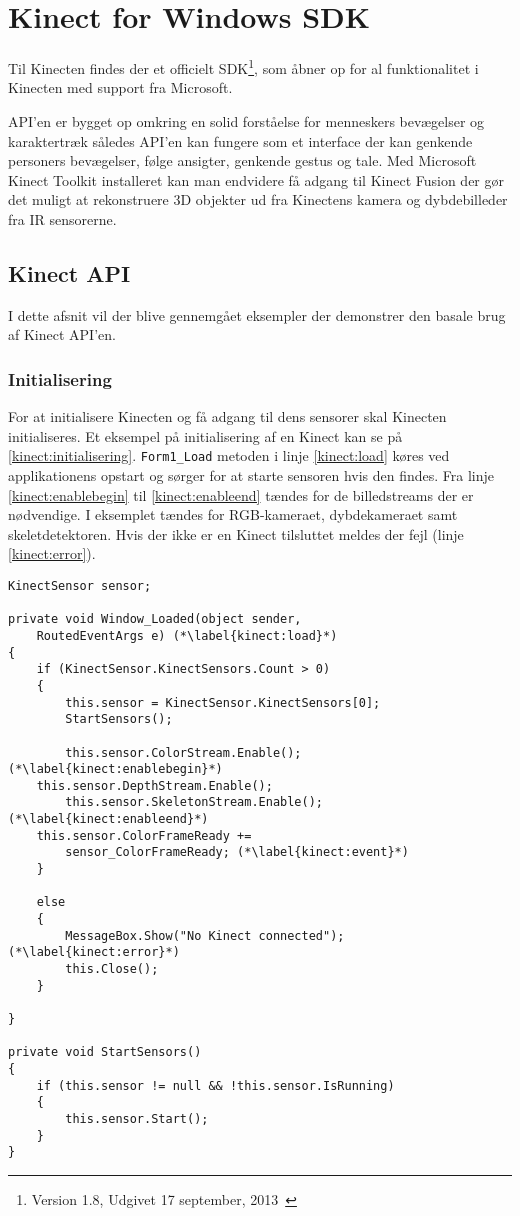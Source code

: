 \section{Kinect for Windows SDK}
Til Kinecten findes der et officielt SDK\footnote{ Version 1.8, Udgivet 17 september, 2013~\cite{kinectSDK18}}, som åbner op for al funktionalitet i Kinecten med support fra Microsoft.

API'en er bygget op omkring en solid forståelse for menneskers bevægelser og karaktertræk således API'en kan fungere som et interface der kan genkende personers bevægelser, følge ansigter, genkende gestus og tale.
Med Microsoft Kinect Toolkit installeret kan man endvidere få adgang til Kinect Fusion der gør det muligt at rekonstruere 3D objekter ud fra Kinectens kamera og dybdebilleder fra IR sensorerne.~\cite{kinectForWindowsFeatures}


\subsection{Kinect API}\label{kinect:kinectapi}
I dette afsnit vil der blive gennemgået eksempler der demonstrer den basale brug af Kinect API'en.

\subsubsection{Initialisering}
For at initialisere Kinecten og få adgang til dens sensorer skal Kinecten initialiseres.
Et eksempel på initialisering af en Kinect kan se på \cref{kinect:initialisering}. \lstinline[style=csharp]|Form1_Load| metoden i linje \ref{kinect:load} køres ved applikationens opstart og sørger for at starte sensoren hvis den findes. Fra linje \ref{kinect:enablebegin} til \ref{kinect:enableend} tændes for de billedstreams der er nødvendige. I eksemplet tændes for RGB-kameraet, dybdekameraet samt skeletdetektoren. Hvis der ikke er en Kinect tilsluttet meldes der fejl (linje \ref{kinect:error}).

\begin{lstlisting}[style=csharp, label=kinect:initialisering, caption={Initialisering af en Kinect sensor}]
KinectSensor sensor;

private void Window_Loaded(object sender,
	RoutedEventArgs e) (*\label{kinect:load}*)
{
    if (KinectSensor.KinectSensors.Count > 0)
    {
        this.sensor = KinectSensor.KinectSensors[0];
        StartSensors();
        
        this.sensor.ColorStream.Enable();(*\label{kinect:enablebegin}*)    
	this.sensor.DepthStream.Enable();
        this.sensor.SkeletonStream.Enable();(*\label{kinect:enableend}*)
	this.sensor.ColorFrameReady += 
		sensor_ColorFrameReady; (*\label{kinect:event}*)
    }

    else
    {
        MessageBox.Show("No Kinect connected"); (*\label{kinect:error}*)
        this.Close();
    }

}

private void StartSensors()
{
    if (this.sensor != null && !this.sensor.IsRunning)
    {
        this.sensor.Start();
    }
}
\end{lstlisting}

